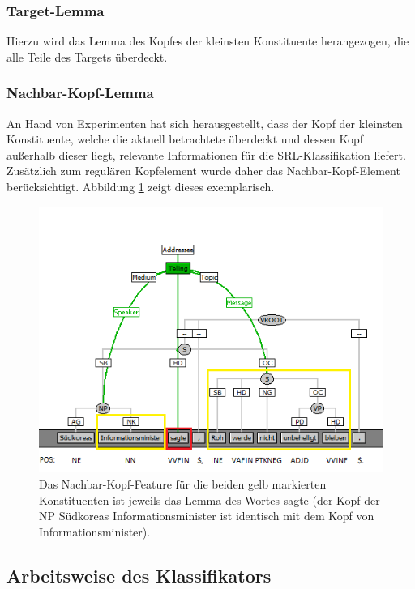 \documentclass[12pt]{article}
\begin{document}
\subsubsection*{Target-Lemma}

Hierzu wird das Lemma des Kopfes der kleinsten Konstituente herangezogen, die alle Teile des Targets überdeckt.

\subsubsection*{Nachbar-Kopf-Lemma}

An Hand von Experimenten hat sich herausgestellt, dass der Kopf der kleinsten Konstituente, welche die aktuell betrachtete überdeckt und dessen Kopf außerhalb dieser liegt, relevante Informationen für die SRL-Klassifikation liefert. Zusätzlich zum regulären Kopfelement wurde daher das Nachbar-Kopf-Element berücksichtigt. Abbildung \ref{nextHead} zeigt dieses exemplarisch.  

	\begin{figure}[tb!]
		\centering
		\includegraphics{images/nextHead.png}
		\caption[Das Nachbar-Kopf-Feature]{Das Nachbar-Kopf-Feature für die beiden gelb markierten Konstituenten ist jeweils das Lemma des Wortes \glqq{}sagte\grqq{} (der Kopf der NP \glqq{}Südkoreas Informationsminister\grqq{} ist identisch mit dem Kopf von \glqq{}Informationsminister\grqq{}). }
		\label{nextHead}
	\end{figure}


\subsection{Arbeitsweise des Klassifikators}
\end{document}
